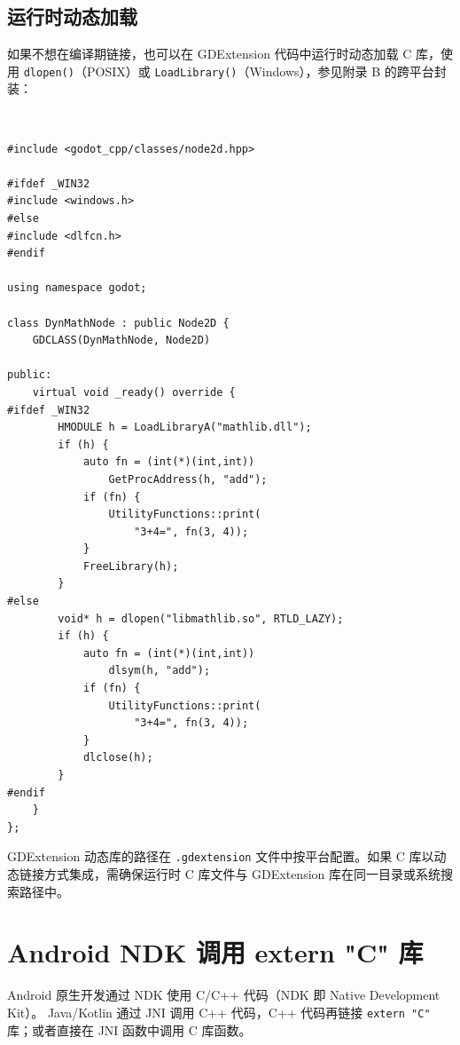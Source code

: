 \documentclass[12pt,a4paper,fontset=fandol]{ctexbook}
\newcommand{\cpplabel}{%
  \begin{tcolorbox}[enhanced,colback=cppheadbg,colframe=cppheadbg,
    arc=1mm,boxrule=0mm,left=6pt,right=6pt,top=2pt,bottom=2pt,
    halign=left,oversize]
    \textcolor{white}{\small\bfseries C++}
  \end{tcolorbox}\vspace{-4pt}}
\newcommand{\cpp}[1]{C++#1}
\newcommand{\Fn}[1]{\texttt{#1()}}
\begin{document}
\subsection{运行时动态加载}

如果不想在编译期链接，也可以在 GDExtension 代码中运行时动态加载 C 库，使用 \Fn{dlopen}（POSIX）或 \Fn{LoadLibrary}（Windows），参见附录 B 的跨平台封装：

\cpplabel
\begin{lstlisting}[style=cppstyle]
#include <godot_cpp/classes/node2d.hpp>

#ifdef _WIN32
#include <windows.h>
#else
#include <dlfcn.h>
#endif

using namespace godot;

class DynMathNode : public Node2D {
    GDCLASS(DynMathNode, Node2D)

public:
    virtual void _ready() override {
#ifdef _WIN32
        HMODULE h = LoadLibraryA("mathlib.dll");
        if (h) {
            auto fn = (int(*)(int,int))
                GetProcAddress(h, "add");
            if (fn) {
                UtilityFunctions::print(
                    "3+4=", fn(3, 4));
            }
            FreeLibrary(h);
        }
#else
        void* h = dlopen("libmathlib.so", RTLD_LAZY);
        if (h) {
            auto fn = (int(*)(int,int))
                dlsym(h, "add");
            if (fn) {
                UtilityFunctions::print(
                    "3+4=", fn(3, 4));
            }
            dlclose(h);
        }
#endif
    }
};
\end{lstlisting}

\begin{tcolorbox}[note={.gdextension 配置}]
GDExtension 动态库的路径在 \texttt{.gdextension} 文件中按平台配置。如果 C 库以动态链接方式集成，需确保运行时 C 库文件与 GDExtension 库在同一目录或系统搜索路径中。
\end{tcolorbox}

\section{Android NDK 调用 extern "C" 库}

Android 原生开发通过 NDK 使用 C/\allowbreak{}\cpp{} 代码（NDK 即 Native Development Kit）。
Java/Kotlin 通过 JNI 调用 \cpp{} 代码，\cpp{} 代码再链接 \texttt{extern "C"} 库；或者直接在 JNI 函数中调用 C 库函数。
\end{document}
